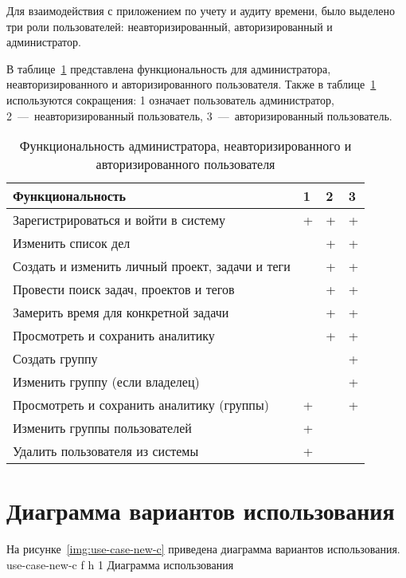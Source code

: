 Для взаимодействия с приложением по учету и аудиту времени, было выделено три роли пользователей: неавторизированный, авторизированный и администратор.

В таблице~\ref{tab:functionality} представлена функциональность для администратора, неавторизированного и авторизированного пользователя. 
Также в таблице~\ref{tab:functionality} используются сокращения: 1 означает пользователь администратор, 2~---~неавторизированный пользователь, 3~---~авторизированный пользователь.

\begin{table}[h!]
	\caption{Функциональность администратора, неавторизированного и авторизированного пользователя}
	\label{tab:functionality}
	\centering
	
	\begin{tabular}{|l|l|l|l|}
		\hline
		\textbf{Функциональность} & \textbf{1} & \textbf{2} & \textbf{3} \\ \hline
		Зарегистрироваться и войти в систему & + & + & + \\ \hline
		Изменить список дел &  & + & + \\ \hline
		Создать и изменить личный проект, задачи и теги &  & + & + \\ \hline
		Провести поиск задач, проектов и тегов &  & + & + \\ \hline
		Замерить время для конкретной задачи  &  & + & + \\ \hline
		Просмотреть и сохранить аналитику &  & + & + \\ \hline
		Создать группу &  &  & + \\ \hline
		Изменить группу (если владелец) &  &  & + \\ \hline
		Просмотреть и сохранить аналитику (группы) & + &   & + \\ \hline
		Изменить группы пользователей & + &  &  \\ \hline
		Удалить пользователя из системы & + &  &  \\ \hline
	\end{tabular}
	
\end{table}




\clearpage
\section{Диаграмма вариантов использования}

На рисунке~\ref{img:use-case-new-c} приведена диаграмма вариантов использования.
{use-case-new-c} %
{f} %
{h} %
{1\textwidth} %
{Диаграмма использования} %

